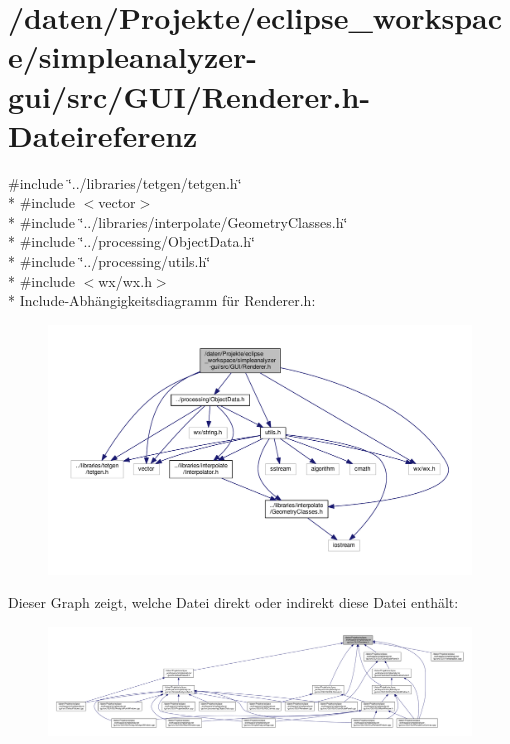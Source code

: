 \hypertarget{simpleanalyzer-gui_2src_2GUI_2Renderer_8h}{\section{/daten/\-Projekte/eclipse\-\_\-workspace/simpleanalyzer-\/gui/src/\-G\-U\-I/\-Renderer.h-\/\-Dateireferenz}
\label{simpleanalyzer-gui_2src_2GUI_2Renderer_8h}
}
{\ttfamily \#include \char`\"{}../libraries/tetgen/tetgen.\-h\char`\"{}}\\*
{\ttfamily \#include $<$vector$>$}\\*
{\ttfamily \#include \char`\"{}../libraries/interpolate/\-Geometry\-Classes.\-h\char`\"{}}\\*
{\ttfamily \#include \char`\"{}../processing/\-Object\-Data.\-h\char`\"{}}\\*
{\ttfamily \#include \char`\"{}../processing/utils.\-h\char`\"{}}\\*
{\ttfamily \#include $<$wx/wx.\-h$>$}\\*
Include-\/\-Abhängigkeitsdiagramm für Renderer.\-h\-:
\nopagebreak
\begin{figure}[H]
\begin{center}
\leavevmode
\includegraphics[width=350pt]{simpleanalyzer-gui_2src_2GUI_2Renderer_8h__incl}
\end{center}
\end{figure}
Dieser Graph zeigt, welche Datei direkt oder indirekt diese Datei enthält\-:
\nopagebreak
\begin{figure}[H]
\begin{center}
\leavevmode
\includegraphics[width=350pt]{simpleanalyzer-gui_2src_2GUI_2Renderer_8h__dep__incl}
\end{center}
\end{figure}
